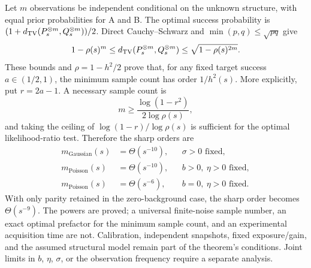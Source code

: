 Let $m$ observations be independent conditional on the unknown structure,
with equal prior probabilities for A and B. The optimal success probability
is $(1+d_{\rm TV}(P_s^{\otimes m},Q_s^{\otimes m}))/2$. Direct Cauchy--Schwarz
and $\min(p,q)\le\sqrt{pq}$ give
\[
 1-\rho(s)^m\le d_{\rm TV}(P_s^{\otimes m},Q_s^{\otimes m})
 \le\sqrt{1-\rho(s)^{2m}}.
\]
These bounds and $\rho=1-h^2/2$ prove that, for any fixed target success
$a\in(1/2,1)$, the minimum sample count has order $1/h^2(s)$. More explicitly,
put $r=2a-1$. A necessary sample count is
\[
 m\ge\frac{\log(1-r^2)}{2\log\rho(s)},
\]
and taking the ceiling of $\log(1-r)/\log\rho(s)$ is sufficient for the
optimal likelihood-ratio test. Therefore the sharp orders are
\[
 \boxed{\begin{aligned}
  m_\mathrm{Gaussian}(s)&=\Theta(s^{-10}),&&\sigma>0\text{ fixed},\\
  m_\mathrm{Poisson}(s)&=\Theta(s^{-10}),&&b>0,\ \eta>0\text{ fixed},\\
  m_\mathrm{Poisson}(s)&=\Theta(s^{-6}),&&b=0,\ \eta>0\text{ fixed}.
 \end{aligned}}
\]
With only parity retained in the zero-background case, the sharp order
becomes $\Theta(s^{-9})$. The powers are proved; a universal finite-noise
sample number, an exact optimal prefactor for the minimum sample count,
and an experimental acquisition time are not. Calibration, independent
snapshots, fixed exposure/gain, and the assumed structural model remain
part of the theorem's conditions. Joint limits in $b$, $\eta$, $\sigma$,
or the observation frequency require a separate analysis.

